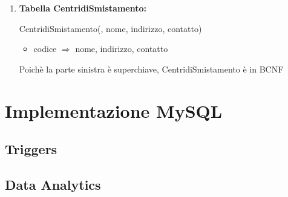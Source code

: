\documentclass[12pt,a4paper]{article}
\begin{document}
\begin{enumerate}
\item[] \textbf{Tabella CentridiSmistamento:}

CentridiSmistamento(\underline{}, nome, indirizzo, contatto)
\begin{itemize}
\vspace{-5pt}
\item codice $\Rightarrow$ nome, indirizzo, contatto
\vspace{-5pt}
\end{itemize}
Poichè la parte sinistra è superchiave, CentridiSmistamento è in BCNF
\vspace{10pt}


\end{enumerate}


\section{Implementazione MySQL}
\subsection{Triggers}
\subsection{Data Analytics}
\end{document}
